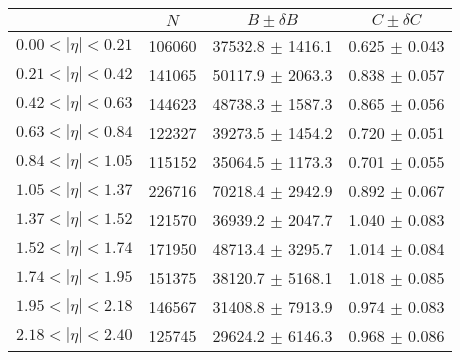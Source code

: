 \begin{tabular}{lccc}
\hline
    &   $N$   & $B \pm \delta B$  &  $C \pm \delta C$ \\
\hline
$0.00 < |\eta| <0.21$          & 106060     & 37532.8    $\pm$ 1416.1 & 0.625      $\pm$ 0.043 \\
$0.21 < |\eta| <0.42$          & 141065     & 50117.9    $\pm$ 2063.3 & 0.838      $\pm$ 0.057 \\
$0.42 < |\eta| <0.63$          & 144623     & 48738.3    $\pm$ 1587.3 & 0.865      $\pm$ 0.056 \\
$0.63 < |\eta| <0.84$          & 122327     & 39273.5    $\pm$ 1454.2 & 0.720      $\pm$ 0.051 \\
$0.84 < |\eta| <1.05$          & 115152     & 35064.5    $\pm$ 1173.3 & 0.701      $\pm$ 0.055 \\
$1.05 < |\eta| <1.37$          & 226716     & 70218.4    $\pm$ 2942.9 & 0.892      $\pm$ 0.067 \\
$1.37 < |\eta| <1.52$          & 121570     & 36939.2    $\pm$ 2047.7 & 1.040      $\pm$ 0.083 \\
$1.52 < |\eta| <1.74$          & 171950     & 48713.4    $\pm$ 3295.7 & 1.014      $\pm$ 0.084 \\
$1.74 < |\eta| <1.95$          & 151375     & 38120.7    $\pm$ 5168.1 & 1.018      $\pm$ 0.085 \\
$1.95 < |\eta| <2.18$          & 146567     & 31408.8    $\pm$ 7913.9 & 0.974      $\pm$ 0.083 \\
$2.18 < |\eta| <2.40$          & 125745     & 29624.2    $\pm$ 6146.3 & 0.968      $\pm$ 0.086 \\
\hline
\end{tabular}
